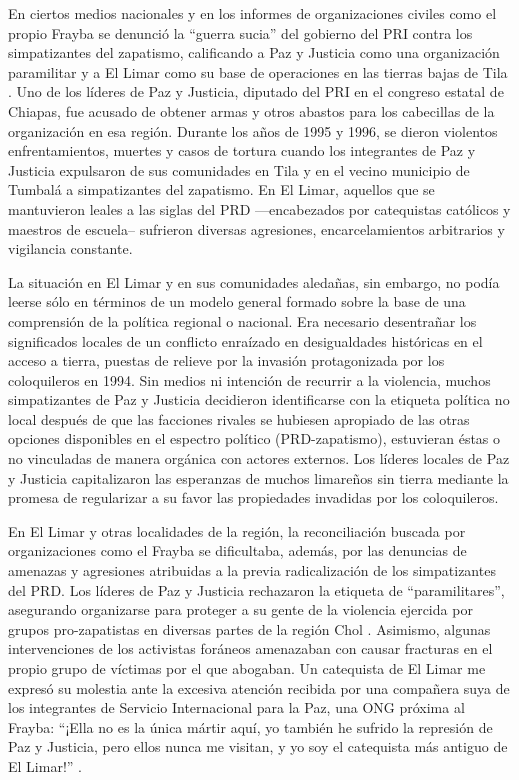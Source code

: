 \documentclass[
  spanish,
  11pt,
  a4paper,
]{scrbook}
\begin{document}
En ciertos medios nacionales y en los informes de organizaciones civiles
como el propio Frayba se denunció la ``guerra sucia'' del gobierno del
PRI contra los simpatizantes del zapatismo, calificando a Paz y Justicia
como una organización paramilitar y a El Limar como su base de
operaciones en las tierras bajas de Tila \autocite[107]{CDHFBC1996}. Uno
de los líderes de Paz y Justicia, diputado del PRI en el congreso
estatal de Chiapas, fue acusado de obtener armas y otros abastos para
los cabecillas de la organización en esa región. Durante los años de
1995 y 1996, se dieron violentos enfrentamientos, muertes y casos de
tortura cuando los integrantes de Paz y Justicia expulsaron de sus
comunidades en Tila y en el vecino municipio de Tumbalá a simpatizantes
del zapatismo. En El Limar, aquellos que se mantuvieron leales a las
siglas del PRD ---encabezados por catequistas católicos y maestros de
escuela-- sufrieron diversas agresiones, encarcelamientos arbitrarios y
vigilancia constante.

La situación en El Limar y en sus comunidades aledañas, sin embargo, no
podía leerse sólo en términos de un modelo general formado sobre la base
de una comprensión de la política regional o nacional. Era necesario
desentrañar los significados locales de un conflicto enraízado en
desigualdades históricas en el acceso a tierra, puestas de relieve por
la invasión protagonizada por los coloquileros en 1994. Sin medios ni
intención de recurrir a la violencia, muchos simpatizantes de Paz y
Justicia decidieron identificarse con la etiqueta política no local
después de que las facciones rivales se hubiesen apropiado de las otras
opciones disponibles en el espectro político (PRD-zapatismo), estuvieran
éstas o no vinculadas de manera orgánica con actores externos. Los
líderes locales de Paz y Justicia capitalizaron las esperanzas de muchos
limareños sin tierra mediante la promesa de regularizar a su favor las
propiedades invadidas por los coloquileros.

En El Limar y otras localidades de la región, la reconciliación buscada
por organizaciones como el Frayba se dificultaba, además, por las
denuncias de amenazas y agresiones atribuidas a la previa radicalización
de los simpatizantes del PRD. Los líderes de Paz y Justicia rechazaron
la etiqueta de ``paramilitares'', asegurando organizarse para proteger a
su gente de la violencia ejercida por grupos pro-zapatistas en diversas
partes de la región Chol \autocite[585-586]{AgudoSanchiz2006}. Asimismo,
algunas intervenciones de los activistas foráneos amenazaban con causar
fracturas en el propio grupo de víctimas por el que abogaban. Un
catequista de El Limar me expresó su molestia ante la excesiva atención
recibida por una compañera suya de los integrantes de Servicio
Internacional para la Paz, una ONG próxima al Frayba: ``¡Ella no es la
única mártir aquí, yo también he sufrido la represión de Paz y Justicia,
pero ellos nunca me visitan, y yo soy el catequista más antiguo de El
Limar!'' \autocite[582]{AgudoSanchiz2006}.
\end{document}
